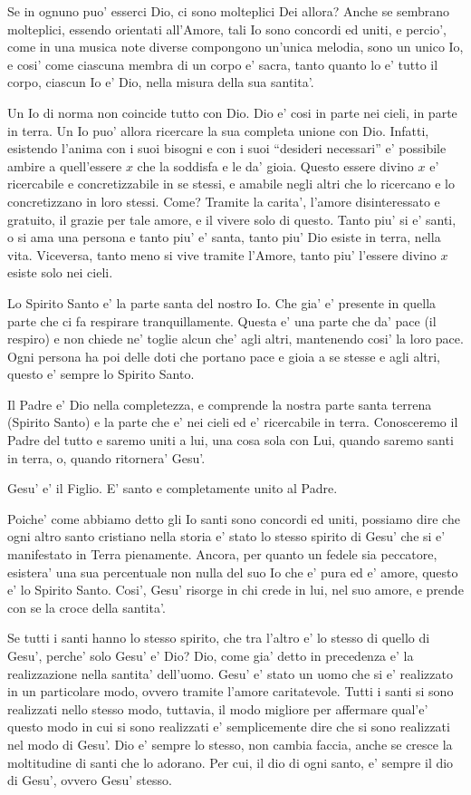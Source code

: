 Se in ognuno puo' esserci Dio, ci sono molteplici Dei allora? Anche se sembrano molteplici, essendo orientati all'Amore, tali Io sono concordi ed uniti, e percio', come in una musica note diverse compongono un'unica melodia, sono un unico Io, e cosi' come ciascuna membra di un corpo e' sacra, tanto quanto lo e' tutto il corpo, ciascun Io e' Dio, nella misura della sua santita'.

Un Io di norma non coincide tutto con Dio. Dio e' cosi in parte nei cieli, in parte in terra. Un Io puo' allora ricercare la sua completa unione con Dio. Infatti, esistendo l'anima con i suoi bisogni e con i suoi ``desideri necessari'' e' possibile ambire a quell'essere $x$ che la soddisfa e le da' gioia. Questo essere divino $x$ e' ricercabile e concretizzabile in se stessi, e amabile negli altri che lo ricercano e lo concretizzano in loro stessi. Come? Tramite la carita',  l'amore disinteressato e gratuito, il grazie per tale amore, e il vivere solo di questo. Tanto piu' si e' santi, o si ama una persona e tanto piu' e' santa, tanto piu' Dio esiste in terra, nella vita. Viceversa, tanto meno si vive tramite l'Amore, tanto piu' l'essere divino $x$ esiste solo nei cieli. 

Lo Spirito Santo e' la parte santa del nostro Io. Che gia' e' presente in quella parte che ci fa respirare tranquillamente. Questa e' una parte che da' pace (il respiro) e non chiede ne' toglie alcun che' agli altri, mantenendo cosi' la loro pace. Ogni persona ha poi delle doti che portano pace e gioia a se stesse e agli altri, questo e' sempre lo Spirito Santo.

Il Padre e' Dio nella completezza, e comprende la nostra parte santa terrena (Spirito Santo) e la parte che e' nei cieli ed e' ricercabile in terra. Conosceremo il Padre del tutto e saremo uniti a lui, una cosa sola con Lui, quando saremo santi in terra, o, quando ritornera' Gesu'.

Gesu' e' il Figlio. E' santo e completamente unito al Padre. 

Poiche' come abbiamo detto gli Io santi sono concordi ed uniti, possiamo dire che ogni altro santo cristiano nella storia e' stato lo stesso spirito di Gesu' che si e' manifestato in Terra pienamente. Ancora, per quanto un fedele sia peccatore, esistera' una sua percentuale non nulla del suo Io che e' pura ed e' amore, questo e' lo Spirito Santo. Cosi', Gesu' risorge in chi crede in lui, nel suo amore, e prende con se la croce della santita'.

Se tutti i santi hanno lo stesso spirito, che tra l'altro e' lo stesso di quello di Gesu', perche' solo Gesu' e' Dio? Dio, come gia' detto in precedenza e' la realizzazione nella santita' dell'uomo. Gesu' e' stato un uomo che si e' realizzato in un particolare modo, ovvero tramite l'amore caritatevole. Tutti i santi si sono realizzati nello stesso modo, tuttavia, il modo migliore per affermare qual'e' questo modo in cui si sono realizzati e' semplicemente dire che si sono realizzati nel modo di Gesu'. Dio e' sempre lo stesso, non cambia faccia, anche se cresce la moltitudine di santi che lo adorano. Per cui, il dio di ogni santo, e' sempre il dio di Gesu', ovvero Gesu' stesso.

